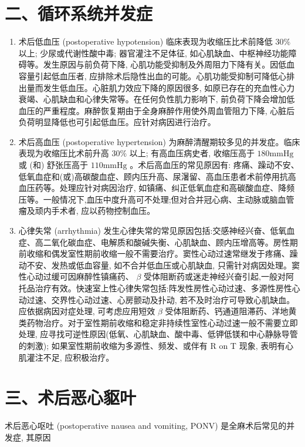 \documentclass[10pt]{article}
\begin{document}
\section*{二、循环系统并发症}
\begin{enumerate}
  \item 术后低血压 (postoperative hypotension) 临床表现为收缩压比术前降低 $30 \%$ 以上; 少尿或代谢性酸中毒; 器官灌注不足体征, 如心肌缺血、中枢神经功能障碍等。发生原因与前负荷下降, 心肌功能受抑制及外周阻力下降有关。因低血容量引起低血压者, 应排除术后隐性出血的可能。心肌功能受抑制可降低心排出量而发生低血压。心脏肌力效应下降的原因很多, 如原已存在的充血性心力衰竭、心肌缺血和心律失常等。在任何负性肌力影响下, 前负荷下降会增加低血压的严重程度。麻醉恢复期由于全身麻醉作用使外周血管阻力下降, 心脏后负荷明显降低也可引起低血压。应针对病因进行治疗。

  \item 术后高血压 (postoperative hypertension) 为麻醉清醒期较多见的并发症。临床表现为收缩压比术前升高 $30 \%$ 以上; 有高血压病史者, 收缩压高于 $180 \mathrm{mmHg}$ 或 (和) 舒张压高于 $110 \mathrm{mmHg}$ 。术后高血压的常见原因有: 疼痛、躁动不安、低氧血症和(或)高碳酸血症、顾内压升高、尿濐留、高血压患者术前停用抗高血压药等。处理应针对病因治疗, 如镇痛、纠正低氧血症和高碳酸血症、降频压等。一般情况下,血压中度升高可不处理;但对合并冠心病、主动脉或脑血管瘤及顽内手术者, 应以药物控制血压。

  \item 心律失常 (arrhythmia) 发生心律失常的常见原因包括:交感神经兴奋、低氧血症、高二氧化碳血症、电解质和酸碱失衡、心肌缺血、顾内压增高等。房性期前收缩和偶发室性期前收缩一般不需要治疗。窦性心动过速常继发于疼痛、躁动不安、发热或低血容量, 如不合并低血压或心肌缺血, 只需针对病因处理。窦性心动过缓可因麻醉性镇痛药、 $\beta$ 受体阻断药或迷走神经兴奋引起,一般对阿托品治疗有效。快速室上性心律失常包括:阵发性房性心动过速、多源性房性心动过速、交界性心动过速、心房颤动及扑动, 若不及时治疗可导致心肌缺血。应依据病因对症处理, 可考虑应用短效 $\beta$ 受体阻断药、钙通道阻滞药、洋地黄类药物治疗。对于室性期前收缩和稳定非持续性室性心动过速一般不需要立即处理, 应寻找可逆性原因(低氧、心肌缺血、酸中毒、低钾低镁和中心静脉导管的刺激); 如果室性期前收缩为多源性、频发、或伴有 R on T 现象, 表明有心肌灌注不足, 应积极治疗。

\end{enumerate}

\section*{三、术后恶心䝙叶}
术后恶心呕吐 (postoperative nausea and vomiting, PONV) 是全麻术后常见的并发症, 其原因
\end{document}
